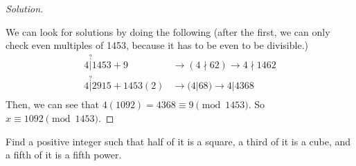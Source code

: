 \documentclass[11pt]{article}
\newcommand{\ndiv}{\nmid}
\newenvironment{problem}[2][Problem]{\begin{trivlist}
\item[\hskip \labelsep {\bfseries #1}\hskip \labelsep {\bfseries #2.}]}{\end{trivlist}}
\newenvironment{solution}
  {\renewcommand\qedsymbol{$~$}\begin{proof}[Solution]$ $\par\nobreak\ignorespaces}
  {\end{proof}}
\begin{document}
\begin{solution}
    We can look for solutions by doing the following (after the first, we can only check even multiples of 1453, because it has to be even to be divisible.)
    \begin{align*}
        4 \stackrel{?}{|} 1453+9       & \rightarrow (4 \ndiv 62)                          \rightarrow 4 \ndiv 1462 \\
        4 \stackrel{?}{|} 2915+1453(2) & \rightarrow (4 | 68)                          \rightarrow 4 | 4368         \\
    \end{align*}
    Then, we can see that $4(1092)=4368 \equiv 9 \pmod{1453}$. So $x\equiv 1092 \pmod{1453}$.
\end{solution}



\begin{problem}{15}
Find a positive integer such that half of it is a square, a third of it is a cube, and a fifth of it is a fifth power.
\end{problem}
\end{document}
